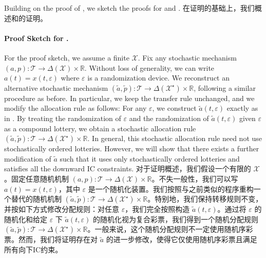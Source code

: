 \documentclass[12pt,letterpaper]{article}
\newenvironment{original}{\color{black}\noindent}{}
\newenvironment{translation}{\color{blue}\noindent}{}
\theoremstyle{plain}
\theoremstyle{definition}
\theoremstyle{remark}
\newcommand{\R}{\mathds{R}}
\renewcommand{\1}{\mathds{1}}
\newcommand{\X}{\mathcal{X}}
\theoremstyle{definition}
\begin{document}
\begin{original}
Building on the proof of , we sketch the proofs for  and .
\end{original}
\begin{translation}
在证明的基础上，我们概述和的证明。
\end{translation}

\paragraph{Proof Sketch for .}\hspace{-2mm}\begin{original}For the proof sketch, we assume a finite $\X$. Fix any stochastic mechanism $(a, p): \mathcal{T} \rightarrow \Delta(\X) \times \R$. Without loss of generality, we can write $a(t) = x(t, \varepsilon)$ where $\varepsilon$ is a randomization device. We reconstruct an alternative stochastic mechanism $(\tilde{a}, \tilde{p}): \mathcal{T} \rightarrow \Delta(\X^\star) \times \R$, following a similar procedure as before. In particular, we keep the transfer rule unchanged, and we modify the allocation rule as follows: For any $\varepsilon$, we construct $\tilde{a}(t, \varepsilon)$ exactly as in . By treating the randomization of $\varepsilon$ and the randomization of $\tilde{a}(t, \varepsilon)$ given $\varepsilon$ as a compound lottery, we obtain a stochastic allocation rule $(\tilde{a}, \tilde{p}): \mathcal{T} \rightarrow \Delta(\X^\star) \times \R$. In general, this stochastic allocation rule need not use stochastically ordered lotteries. However, we will show that there exists a further modification of $\tilde{a}$ such that it uses only stochastically ordered lotteries and satisfies all the downward IC constraints.
\end{original}
\begin{translation}
对于证明概述，我们假设一个有限的 $\X$。固定任意随机机制 $(a, p): \mathcal{T} \rightarrow \Delta(\X) \times \R$。不失一般性，我们可以写 $a(t) = x(t, \varepsilon)$，其中 $\varepsilon$ 是一个随机化装置。我们按照与之前类似的程序重构一个替代的随机机制 $(\tilde{a}, \tilde{p}): \mathcal{T} \rightarrow \Delta(\X^\star) \times \R$。特别地，我们保持转移规则不变，并按如下方式修改分配规则：对任意 $\varepsilon$，我们完全按照构造 $\tilde{a}(t, \varepsilon)$。通过将 $\varepsilon$ 的随机化和给定 $\varepsilon$ 下 $\tilde{a}(t, \varepsilon)$ 的随机化视为复合彩票，我们得到一个随机分配规则 $(\tilde{a}, \tilde{p}): \mathcal{T} \rightarrow \Delta(\X^\star) \times \R$。一般来说，这个随机分配规则不一定使用随机序彩票。然而，我们将证明存在对 $\tilde{a}$ 的进一步修改，使得它仅使用随机序彩票且满足所有向下IC约束。
\end{translation}
\end{document}
